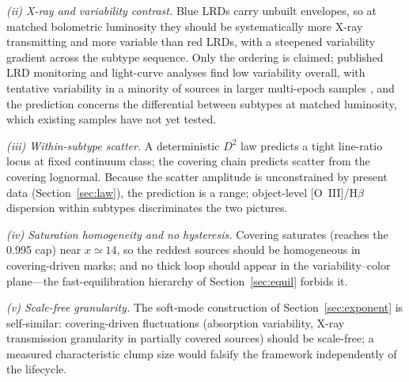 \documentclass[twocolumn]{aastex631}
\begin{document}
\emph{(ii) X-ray and variability contrast.} Blue LRDs carry unbuilt
envelopes, so at matched bolometric luminosity they should be
systematically more X-ray transmitting and more variable than red LRDs,
with a steepened variability gradient across the subtype sequence. Only
the ordering is claimed; published LRD monitoring and light-curve
analyses find low variability
overall, with tentative variability in a minority of sources in larger
multi-epoch samples \citep{Tee2024,Secunda2025,KokuboHarikane2024}, and
the prediction concerns the
differential between subtypes at matched luminosity, which existing
samples have not yet tested.

\emph{(iii) Within-subtype scatter.} A deterministic $D^{2}$ law predicts
a tight line-ratio locus at fixed continuum class; the covering chain
predicts scatter from the covering lognormal. Because the scatter
amplitude is unconstrained by present data (Section~\ref{sec:law}), the
prediction is a range; object-level [O~III]/H$\beta$ dispersion within
subtypes discriminates the two pictures.

\emph{(iv) Saturation homogeneity and no hysteresis.} Covering saturates
(reaches the 0.995 cap) near $x\simeq14$, so the reddest sources should
be homogeneous in covering-driven marks; and no thick loop should appear
in the variability--color plane---the fast-equilibration hierarchy of
Section~\ref{sec:equil} forbids it.

\emph{(v) Scale-free granularity.} The soft-mode construction of
Section~\ref{sec:exponent} is self-similar: covering-driven fluctuations
(absorption variability, X-ray transmission granularity in partially
covered sources) should be scale-free; a measured characteristic clump
size would falsify the framework independently of the lifecycle.
\end{document}
